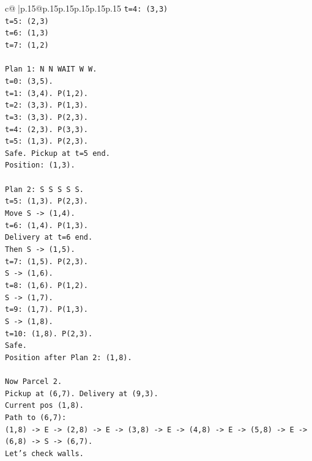 \documentclass{article}
\begin{document}
{\begin{supertabular}{c@{$\;$}|p{.15\linewidth}@{}p{.15\linewidth}p{.15\linewidth}p{.15\linewidth}p{.15\linewidth}p{.15\linewidth}}
{{{\texttt{t=4: (3,3)} \\
\texttt{t=5: (2,3)} \\
\texttt{t=6: (1,3)} \\
\texttt{t=7: (1,2)} \\
\\ 
\texttt{Plan 1: N N WAIT W W.} \\
\texttt{t=0: (3,5).} \\
\texttt{t=1: (3,4). P(1,2).} \\
\texttt{t=2: (3,3). P(1,3).} \\
\texttt{t=3: (3,3). P(2,3).} \\
\texttt{t=4: (2,3). P(3,3).} \\
\texttt{t=5: (1,3). P(2,3).} \\
\texttt{Safe. Pickup at t=5 end.} \\
\texttt{Position: (1,3).} \\
\\ 
\texttt{Plan 2: S S S S S.} \\
\texttt{t=5: (1,3). P(2,3).} \\
\texttt{Move S {-}> (1,4).} \\
\texttt{t=6: (1,4). P(1,3).} \\
\texttt{Delivery at t=6 end.} \\
\texttt{Then S {-}> (1,5).} \\
\texttt{t=7: (1,5). P(2,3).} \\
\texttt{S {-}> (1,6).} \\
\texttt{t=8: (1,6). P(1,2).} \\
\texttt{S {-}> (1,7).} \\
\texttt{t=9: (1,7). P(1,3).} \\
\texttt{S {-}> (1,8).} \\
\texttt{t=10: (1,8). P(2,3).} \\
\texttt{Safe.} \\
\texttt{Position after Plan 2: (1,8).} \\
\\ 
\texttt{Now Parcel 2.} \\
\texttt{Pickup at (6,7). Delivery at (9,3).} \\
\texttt{Current pos (1,8).} \\
\texttt{Path to (6,7):} \\
\texttt{(1,8) {-}> E {-}> (2,8) {-}> E {-}> (3,8) {-}> E {-}> (4,8) {-}> E {-}> (5,8) {-}> E {-}> (6,8) {-}> S {-}> (6,7).} \\
\texttt{Let's check walls.} \\
}}}
\end{supertabular}}
\end{document}
